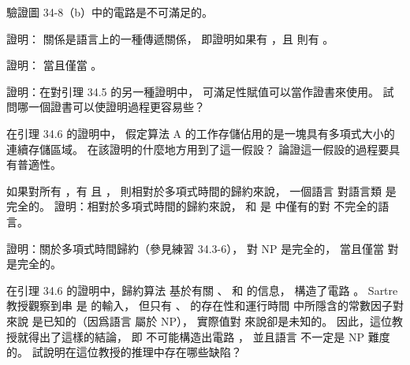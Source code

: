\startsection[
  title={NP-completeness and reducibility},
]

\startEXERCISE
驗證圖 34-8（b）中的電路是不可滿足的。
\stopEXERCISE

\startANSWER
{}
\stopANSWER

\startEXERCISE
證明：  關係是語言上的一種傳遞關係，
即證明如果有 ，且  則有 。
\stopEXERCISE

\startANSWER
{}
\stopANSWER

\startEXERCISE
證明：  當且僅當 。
\stopEXERCISE

\startANSWER
{}
\stopANSWER

\startEXERCISE
證明：在對引理 34.5 的另一種證明中，
可滿足性賦值可以當作證書來使用。
試問哪一個證書可以使證明過程更容易些？
\stopEXERCISE

\startANSWER
{}
\stopANSWER

\startEXERCISE
在引理 34.6 的證明中，
假定算法 A 的工作存儲佔用的是一塊具有多項式大小的連續存儲區域。
在該證明的什麼地方用到了這一假設？
論證這一假設的過程要具有普適性。
\stopEXERCISE

\startANSWER
{}
\stopANSWER

\startEXERCISE
如果對所有 ，有  且 ，
則相對於多項式時間的歸約來說，
一個語言  對語言類  是{\EMP 完全的}。
證明：相對於多項式時間的歸約來說，
 \m{\phi} 和  是  中僅有的對  不完全的語言。
\stopEXERCISE

\startANSWER
{}
\stopANSWER

\startEXERCISE
證明：關於多項式時間歸約（參見練習 34.3-6），
  對 NP 是完全的，
當且僅當  對  是完全的。
\stopEXERCISE

\startANSWER
{}
\stopANSWER

\startEXERCISE
在引理 34.6 的證明中，歸約算法  基於有關 、  和  的信息，
構造了電路 。
 Sartre 教授觀察到串  是  的輸入，
但只有 、  的存在性和運行時間  中所隱含的常數因子對  來說
是已知的（因爲語言  屬於 NP），
實際值對  來說卻是未知的。
因此，這位教授就得出了這樣的結論，
即  不可能構造出電路 ，
並且語言  不一定是 NP 難度的。
試說明在這位教授的推理中存在哪些缺陷？
\stopEXERCISE

\startANSWER
{}
\stopANSWER

\stopsection
